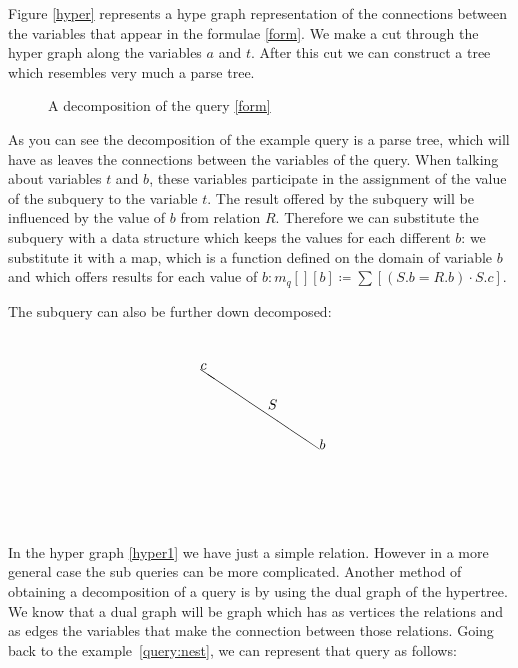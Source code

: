\documentclass[12pt]{article}
\begin{document}
Figure \ref{hyper} represents a hype graph representation of the connections between the variables that appear in the formulae \ref{form}. We make a cut through the hyper graph along the variables $a$ and $t$. After this cut we can construct a tree which resembles very much a parse tree.

\begin{figure}[htbp]
\begin{center}
\usetikzlibrary{fit}
\end{center}
\caption{A decomposition of the query \ref{form}}
\label{figtree}
\end{figure}
As you can see the decomposition of the example query is a parse tree, which will have as leaves the connections between the variables of the query. When talking about variables $t$ and $b$, these variables participate in the assignment of the value of the subquery to the variable $t$. The result offered by the subquery will be influenced by the value of $b$ from relation $R$. Therefore we can substitute the subquery with a data structure which keeps the values for each different $b$: we substitute it with a map, which is a function defined on the domain of variable $b$ and which offers results for each value of $b: m_q[][b]\coloneqq\sum[(S.b=R.b)\cdot S.c]$.

The subquery can also be further down decomposed:
\begin{align}
\label{hyper1}
\setlength{\unitlength}{1mm}
\begin{picture}(50,50)
\put(40,20){\line(-3,2){30}}
\put(40,20){$b$}
\put(10,40){$c$}
\put(27,30){$S$}
\end{picture}
\end{align}
In the hyper graph \ref{hyper1} we have just a simple relation. However in a more general case the sub queries can be more complicated. Another method of obtaining a decomposition of a query is by using the dual graph of the hypertree. We know that a dual graph will be graph which has as vertices the relations and as edges the variables that make the connection between those relations. Going back to the example~\ref{query:nest}, we can represent that query as follows:
\end{document}
